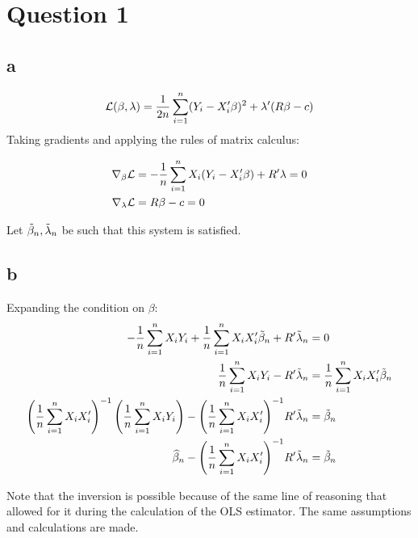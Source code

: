 \documentclass[12pt]{paper}
\begin{document}
\section*{Question 1}

\subsection*{a}

\begin{equation*}
  \mathcal{L}(\beta,\lambda) = \frac{1}{2n} \sum_{i=1}^n ( Y_i - X_i' \beta)^2 + \lambda' ( R
  \beta - c)
\end{equation*}
Taking gradients and applying the rules of matrix calculus:

\begin{align*}
  \nabla_{\beta} \mathcal{L} &= - \frac{1}{n}\sum_{i=1}^n X_i ( Y_i - X_i' \beta) + R' \lambda
  = 0\\
  \nabla_{\lambda} \mathcal{L} &= R \beta - c = 0
\end{align*}

Let $\tilde{ \beta }_{n}, \tilde{ \lambda }_{n}$ be such that this system is satisfied. 

\subsection*{b}

Expanding the condition on $\beta$:
\begin{align*}
  -\frac{1}{n}\sum_{i=1}^n X_i Y_i + \frac{1}{n} \sum_{i=1}^n X_i X_i'
  \tilde{ \beta }_{n} + R' \tilde{ \lambda }_{n} &= 0\\
  \frac{1}{n} \sum_{i=1}^n X_i Y_i - R' \tilde{ \lambda }_{n} &= \frac{1}{n}
                                                  \sum_{i=1}^n X_i X_i'
                                                  \tilde{ \beta }_{n}\\
  {\left( \frac{1}{n} \sum_{i=1}^n X_i X_i'  \right)}^{-1} \left(
  \frac{1}{n} \sum_{i=1}^n  X_i Y_i \right) - {\left( \frac{1}{n}
  \sum_{i=1}^n X_i X_i'  \right)}^{-1} R' \tilde{ \lambda }_{n} &= \tilde{ \beta }_{n}\\
  \widehat{ \beta }_{n} - {\left( \frac{1}{n} \sum_{i=1}^n X_i X_i'
  \right)}^{-1} R' \tilde{ \lambda }_{n} &= \tilde{ \beta }_{n}
\end{align*}

Note that the inversion is possible because of the same line of
reasoning that allowed for it during the calculation of the OLS
estimator. The same assumptions and calculations are made.
\end{document}
